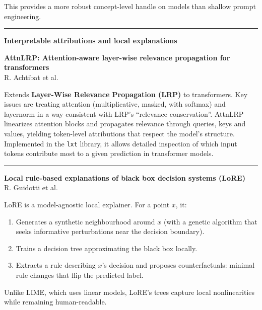 \documentclass[a5paper]{article}
\providecommand{\tightlist}{%
  \setlength{\itemsep}{0pt}\setlength{\parskip}{0pt}}
\def\subsection#1{{\par\bigskip\goodbreak\large\bfseries #1\par}}
\begin{document}
This provides a more robust concept-level handle on models than shallow
prompt engineering.

\begin{center}\rule{0.5\linewidth}{0.5pt}\end{center}

\subsection{Interpretable attributions and local
explanations}\label{interpretable-attributions-and-local-explanations}

\textbf{AttnLRP: Attention-aware layer-wise relevance propagation for
transformers}\\
R. Achtibat et al.

Extends \textbf{Layer-Wise Relevance Propagation (LRP)} to transformers.
Key issues are treating attention (multiplicative, masked, with softmax)
and layernorm in a way consistent with LRP's ``relevance conservation''.
AttnLRP linearizes attention blocks and propagates relevance through
queries, keys and values, yielding token-level attributions that respect
the model's structure. Implemented in the \texttt{lxt} library, it allows
detailed inspection of which input tokens contribute most to a given
prediction in transformer models.

\begin{center}\rule{0.5\linewidth}{0.5pt}\end{center}

\textbf{Local rule-based explanations of black box decision systems
(LoRE)}\\
R. Guidotti et al.

LoRE is a model-agnostic local explainer. For a point $x$, it:

\begin{enumerate}
\def\labelenumi{\arabic{enumi}.}
\tightlist
\item
  Generates a synthetic neighbourhood around $x$ (with a genetic algorithm
  that seeks informative perturbations near the decision boundary).
\item
  Trains a decision tree approximating the black box locally.
\item
  Extracts a rule describing $x$'s decision and proposes counterfactuals:
  minimal rule changes that flip the predicted label.
\end{enumerate}

Unlike LIME, which uses linear models, LoRE's trees capture local
nonlinearities while remaining human-readable.
\end{document}
